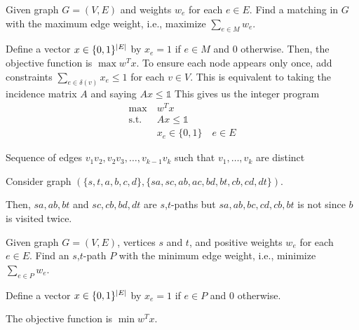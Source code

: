 \begin{example}
  Given graph $G = (V, E)$ and weights $w_e$ for each $e \in E$. Find a matching in $G$ with the maximum edge weight, i.e., maximize $\sum_{e \in M} w_e$.
\end{example}
\begin{sol}
  Define a vector $x \in \{0,1\}^{\abs{E}}$ by $x_e = 1$ if $e \in M$ and $0$ otherwise.
  Then, the objective function is $\max w^T x$.
  To ensure each node appears only once, add constraints $\sum_{e \in \delta(v)} x_e \leq 1$ for each $v \in V$. This is equivalent to taking the incidence matrix $A$ and saying $Ax \leq \mathbb{1}$
  This gives us the integer program
  \begin{align*}
    \max\         & w^T x                         \\
    \text{s.t.}\  & Ax \leq \mathbb{1}            \\
                  & x_e \in \{0,1\} \quad e \in E
  \end{align*}
\end{sol}

\begin{defn}[$v_1$,$v_k$-path]
  Sequence of edges $v_1v_2, v_2v_3, \dotsc, v_{k-1}v_k$ such that $v_1,\dotsc,v_k$ are distinct
\end{defn}
\begin{example}\label{ex:path}
  Consider graph $(\{s,t,a,b,c,d\}, \{sa,sc,ab,ac,bd,bt,cb,cd,dt\})$.
  \begin{center}
  \end{center}  
  Then, $sa,ab,bt$ and $sc,cb,bd,dt$ are $s$,$t$-paths but $sa,ab,bc,cd,cb,bt$ is not since $b$ is visited twice.
\end{example}


\begin{problem}
  Given graph $G = (V, E)$, vertices $s$ and $t$, and positive weights $w_e$ for each $e \in E$. Find an $s$,$t$-path $P$ with the minimum edge weight, i.e., minimize $\sum_{e \in P} w_e$.
\end{problem}

Define a vector $x \in \{0,1\}^{\abs{E}}$ by $x_e = 1$ if $e \in P$ and $0$ otherwise.

The objective function is $\min w^T x$.

